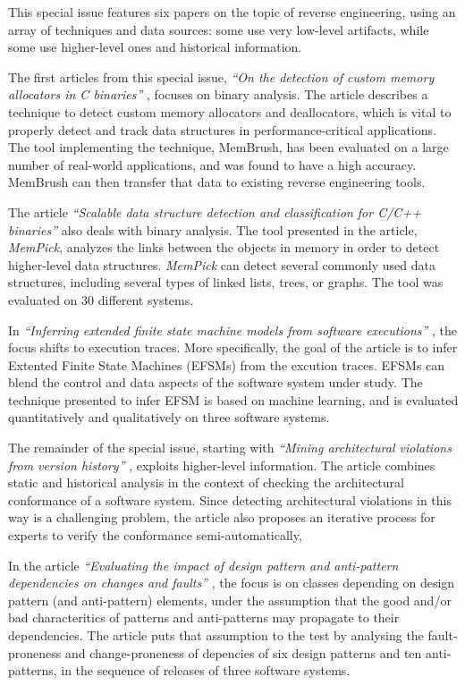 \documentclass{svjour3}                     %
\begin{document}
This special issue features six papers on the topic of reverse engineering, using an array of techniques and data sources: some use very low-level artifacts, while some use higher-level ones and historical information.

The first articles from this special issue, \emph{``On the detection of custom memory allocators in C binaries''} \citep{memory}, focuses on binary analysis. The article describes a technique to detect custom memory allocators and deallocators, which is vital to properly detect and track data structures in performance-critical applications. The tool implementing the technique, MemBrush, has been evaluated on a large number of real-world applications, and was found to have a high accuracy. MemBrush can then transfer that data to existing reverse engineering tools. 

The article \emph{``Scalable data structure detection and classification for C/C++ binaries''} \citep{structures} also deals with binary analysis. The tool presented in the article, {\em MemPick}, analyzes the links between the objects in memory in order to detect higher-level data structures. {\em MemPick} can detect several commonly used data structures, including several types of linked lists, trees, or graphs. The tool was evaluated on 30 different systems.

In \emph{``Inferring extended finite state machine models from software executions''} \citep{stateMachines}, the focus shifts to execution traces. More specifically, the goal of the article is to infer Extented Finite State Machines (EFSMs) from the excution traces. EFSMs can blend the control and data aspects of the software system under study. The technique presented to infer EFSM is based on machine learning, and is evaluated quantitatively and qualitatively on three software systems.

The remainder of the special issue, starting with \emph{``Mining architectural violations from version history''} \citep{architecture}, exploits higher-level information. The article combines static and historical analysis in the context of checking the architectural conformance of a software system. Since detecting architectural violations in this way is a challenging problem, the article also proposes an iterative process for experts to verify the conformance semi-automatically,

In the article \emph{``Evaluating the impact of design pattern and anti-pattern dependencies on changes and faults''} \citep{patterns}, the focus is on classes depending on design pattern (and anti-pattern) elements, under the assumption that the good and/or bad characteritics of patterns and anti-patterns may propagate to their dependencies. The article puts that assumption to the test by analysing the fault-proneness and change-proneness of depencies of six design patterns and ten anti-patterns, in the sequence of releases of three software systems.
\end{document}
